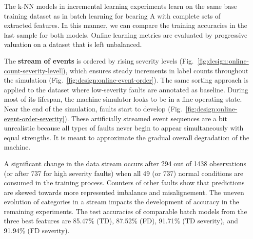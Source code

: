 The k-NN models in incremental learning experiments learn on the same base training dataset as in batch learning for bearing A with complete sets of extracted features. In this manner, we can compare the training accuracies in the last sample for both models. Online learning metrics are evaluated by progressive valuation on a dataset that is left unbalanced.

The \textbf{stream of events} is ordered by rising severity levels (Fig.~\ref{fig:design:online-count-severity-level}), which ensures steady increments in label counts throughout the simulation (Fig.~\ref{fig:design:online-event-order}). The same sorting approach is applied to the dataset where low-severity faults are annotated as baseline. During most of its lifespan, the machine simulator looks to be in a fine operating state. Near the end of the simulation, faults start to develop (Fig.~\ref{fig:design:online-event-order-severity}). These artificially streamed event sequences are a bit unrealistic because all types of faults never begin to appear simultaneously with equal strengths. It is meant to approximate the gradual overall degradation of the machine.

A significant change in the data stream occurs after 294 out of 1438 observations (or after 737 for high severity faults) when all 49 (or 737) normal conditions are consumed in the training process. Counters of other faults show that predictions are skewed towards more represented imbalance and misalignement. The uneven evolution of categories in a stream impacts the development of accuracy in the remaining experiments. The test accuracies of comparable batch models from the three best features are 85.47\% (TD), 87.52\% (FD), 91.71\% (TD severity), and 91.94\% (FD severity).

